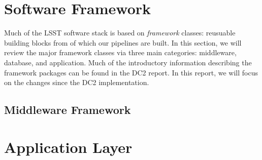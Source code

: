 \documentclass[preprint]{aastex}
\begin{document}




\section{Software Framework}

Much of the LSST software stack is based on \textit{framework}
classes: reusuable building blocks from of which our pipelines are
built.  In this section, we will review the major framework classes
via three main categories:  middleware, database, and
application.  Much of the introductory information describing the
framework packages can be found in the DC2 report.  In this report, we
will focus on the changes since the DC2 implementation.  

\subsection{Middleware Framework}









% 



\section{Application Layer} \label{sec:applayer}




























\end{document}
